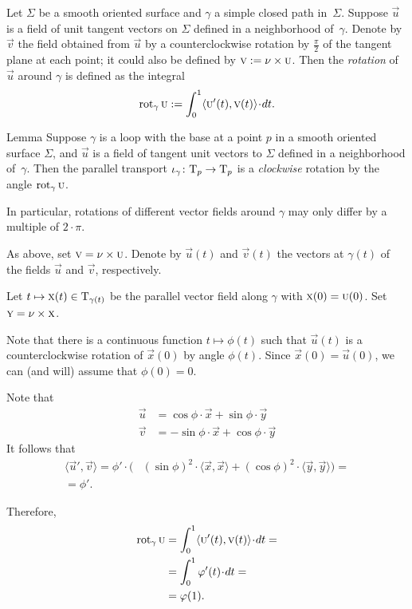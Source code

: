 Let $\Sigma$ be a smooth oriented surface and $\gamma$ a simple closed path in~$\Sigma$.
Suppose $\vec u$ is a field of unit tangent vectors on $\Sigma$ defined in a neighborhood of~$\gamma$.
Denote by $\vec v$ the field obtained from $\vec u$ by a counterclockwise rotation by $\tfrac{\pi}2$ of the tangent plane at each point; it could also be defined by $\text{\sc{v}}\mathrel{:=}\nu\times\text{\sc{u}}$.
Then the \emph{rotation} of $\vec u$ around $\gamma$ is defined as the integral
\[\rot_\gamma\vec u
\df
\int_0^1\langle\vec u'(t),\vec v(t)\rangle\cdot dt.\]

\begin{thm}{Lemma}\label{lem:rotation-parallel}
Suppose $\gamma$ is a loop with the base at a point $p$ in a smooth oriented surface $\Sigma$, and $\vec u$ is a field of tangent unit vectors to $\Sigma$ defined in a neighborhood of~$\gamma$.
Then the parallel transport $\iota_\gamma\colon\mathrm{T}_p\to\mathrm{T}_p$ is a {}\emph{clockwise} rotation by the angle $\mathop{\rm rot}\nolimits_\gamma\text{\sc{u}}$.

In particular, rotations of different vector fields around $\gamma$ may only differ by a multiple of $2\cdot\pi$.
\end{thm}

As above, set $\text{\sc{v}}=\nu\times\text{\sc{u}}$. 
Denote by $\vec u(t)$ and $\vec v(t)$ the vectors at $\gamma(t)$ of the fields $\vec u$ and $\vec v$, respectively.

Let $t\mapsto \text{\sc{x}}(t)\in \mathrm{T}_{\gamma(t)}$ be the parallel vector field along $\gamma$ with  $\vec x(0)\z=\vec u(0)$.
Set $\text{\sc{y}}=\nu\times\text{\sc{x}}$.

Note that there is a continuous function $t\mapsto \phi(t)$ such that 
$\vec u(t)$ is a counterclockwise rotation of $\vec x(0)$ by angle $\phi(t)$.
Since $\vec x(0)=\vec u(0)$, we can (and will) assume that $\phi(0)=0$.

Note that
\begin{align*}
\vec u&=\cos\phi\cdot \vec x+\sin\phi\cdot \vec y
\\
\vec v&=-\sin\phi\cdot \vec x+\cos\phi\cdot \vec y
\end{align*}
It follows that 
\begin{align*}
\langle\vec u',\vec v\rangle
=\phi'\cdot\biggl(&(\sin \phi)^2\cdot \langle\vec x,\vec x\rangle+(\cos \phi)^2\cdot \langle\vec y,\vec y\rangle
\biggr)=
\\
=\phi'.\ &
\end{align*}

Therefore,
\begin{align*}
\rot_\gamma\vec u&=\int_0^1\langle\vec u'(t),\vec v(t)\rangle\cdot dt=
\\
&=\int_0^1\phi'(t)\cdot dt=
\\
&=\phi(1).
\end{align*}

